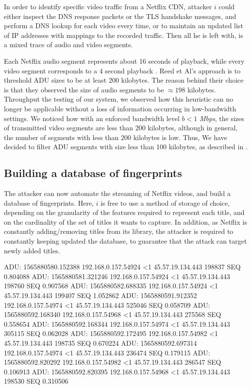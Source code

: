 In order to identify specific video traffic from a Netflix CDN, attacker $i$
could either inspect the DNS response packets or the TLS handshake messages,
and perform a DNS lookup for each video every time, or to maintain an updated
list of IP addresses with mappings to the recorded traffic. Then all he is left
with, is a mixed trace of audio and video segments. 

Each Netflix audio segment represents about 16 seconds of playback, while every
video segment corresponds to a 4 second playback \cite{netflix-real-time}. Reed
et Al's approach is to threshold ADU sizes to be at least 200 kilobytes. The
reason behind their choice is that they observed the size of audio segments to
be $\approx 198$ kilobytes. Throughput the testing of our system, we observed
how this heuristic can no longer be applicable without a loss of information
occurring in low-bandwidth settings. We noticed how with an enforced bandwidth
level $b < 1$ \emph{Mbps}, the sizes of transmitted video segments are less
than 200 kilobytes, although in general, the number of segments with less than
200 kilobytes is low. Thus, We have decided to filter ADU segments with size
less than 100 kilobytes, as described in .

\subsection{Building a database of fingerprints}

The attacker can now automate the streaming of Netflix videos, and build a
database of fingerprints. Here, $i$ is free to use a method of storage of
choice, depending on the granularity of the features required to represent each
title, and on the cardinality of the set of titles it wants to capture.  In
addition, as Netflix is constantly adding/removing titles from its library, the
attacker is required to constantly keeping updated the database, to guarantee
that the attack can target newly added titles.

\begin{adu}[caption={Incoming traffic trace of Mulan, captured at 10Mbps (first 10 segments).}, label={lst:adutrace}]
ADU: 1565880580.152388 192.168.0.157.54924 <1 45.57.19.134.443 198837 SEQ 0.804088
ADU: 1565880581.321246 192.168.0.157.54924 <1 45.57.19.134.443 198760 SEQ 0.907568
ADU: 1565880582.688335 192.168.0.157.54924 <1 45.57.19.134.443 199407 SEQ 1.052862
ADU: 1565880591.912352 192.168.0.157.54974 <1 45.57.19.134.443 525046 SEQ 0.058709
ADU: 1565880592.168340 192.168.0.157.54968 <1 45.57.19.134.443 275568 SEQ 0.558654
ADU: 1565880592.168344 192.168.0.157.54974 <1 45.57.19.134.443 305115 SEQ 0.062028
ADU: 1565880592.172495 192.168.0.157.54982 <1 45.57.19.134.443 198735 SEQ 0.670224
ADU: 1565880592.697314 192.168.0.157.54974 <1 45.57.19.134.443 236474 SEQ 0.179115
ADU: 1565880592.820292 192.168.0.157.54982 <1 45.57.19.134.443 286547 SEQ 0.106913
ADU: 1565880592.820395 192.168.0.157.54968 <1 45.57.19.134.443 198530 SEQ 0.310506
\end{adu}

